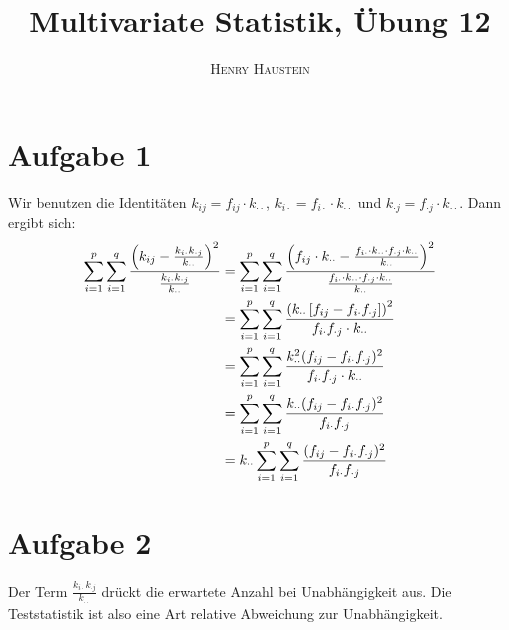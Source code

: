 \documentclass{article}
\title{\textbf{Multivariate Statistik, Übung 12}}
\author{\textsc{Henry Haustein}}
\date{}
\begin{document}
	\maketitle
	
	\section*{Aufgabe 1}
	Wir benutzen die Identitäten $k_{ij}=f_{ij}\cdot k_{\cdot\cdot}$, $k_{i\cdot}=f_{i\cdot}\cdot k_{\cdot\cdot}$ und $k_{\cdot j}=f_{\cdot j}\cdot k_{\cdot\cdot}$. Dann ergibt sich:
	\begin{align}
		\sum_{i=1}^{p}\sum_{i=1}^q \frac{\left(k_{ij}-\frac{k_{i\cdot}k_{\cdot j}}{k_{\cdot\cdot}}\right)^2}{\frac{k_{i\cdot}k_{\cdot j}}{k_{\cdot\cdot}}} &= \sum_{i=1}^{p}\sum_{i=1}^q \frac{\left(f_{ij}\cdot k_{\cdot\cdot}-\frac{f_{i\cdot}\cdot k_{\cdot\cdot}\cdot f_{\cdot j}\cdot k_{\cdot\cdot}}{k_{\cdot\cdot}}\right)^2}{\frac{f_{i\cdot}\cdot k_{\cdot\cdot}\cdot f_{\cdot j}\cdot k_{\cdot\cdot}}{k_{\cdot\cdot}}} \notag \\
		&= \sum_{i=1}^p\sum_{i=1}^q \frac{\left(k_{\cdot\cdot}\left[f_{ij} - f_{i\cdot}f_{\cdot j}\right]\right)^2}{f_{i\cdot}f_{\cdot j}\cdot k_{\cdot\cdot}} \notag \\
		&= \sum_{i=1}^p \sum_{i=1}^q \frac{k_{\cdot\cdot}^2(f_{ij}-f_{i\cdot}f_{\cdot j})^2}{f_{i\cdot}f_{\cdot j}\cdot k_{\cdot\cdot}} \notag \\
		&= \sum_{i=1}^p \sum_{i=1}^q \frac{k_{\cdot\cdot}(f_{ij}-f_{i\cdot}f_{\cdot j})^2}{f_{i\cdot}f_{\cdot j}} \notag \\
		&= k_{\cdot\cdot}\sum_{i=1}^p\sum_{i=1}^q \frac{(f_{ij}-f_{i\cdot}f_{\cdot j})^2}{f_{i\cdot}f_{\cdot j}} \notag
	\end{align}

	\section*{Aufgabe 2}
	Der Term $\frac{k_{i\cdot}k_{\cdot j}}{k_{\cdot\cdot}}$ drückt die erwartete Anzahl bei Unabhängigkeit aus. Die Teststatistik ist also eine Art relative Abweichung zur Unabhängigkeit.
	
\end{document}
